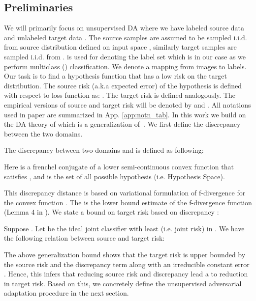 \documentclass[table,dvipsnames]{article}
\theoremstyle{plain}
\theoremstyle{definition}
\theoremstyle{remark}
\begin{document}
\subsection{Preliminaries} 
We will primarily focus on unsupervised DA where we have labeled source data  and unlabeled target data . The source samples are assumed to be sampled i.i.d. from source distribution  defined on input space , similarly target samples are sampled i.i.d. from .  is used for denoting the label set which is  in our case as we perform multiclass () classification. We denote  a mapping from images to labels. Our task is to find a hypothesis function  that {has a low risk on the target distribution}. The source risk (a.k.a expected error) of the hypothesis  is defined with respect to loss function  as: . The target risk  is defined analogously. The empirical versions of source and target risk will be denoted by  and . All notations used in paper are summarized in App. \ref{app:notn_tab}. In this work we build on the DA theory of \citep{acuna2021f} {which is a generalization of~\citet{ben2010theory}}. 
We first define the discrepancy between the two domains.



\begin{definition}[ discrepancy] The discrepancy between two domains  and  is defined as following:

Here  is a frenchel conjugate of a lower semi-continuous convex function   that satisfies , and  is the set of all possible hypothesis (i.e. Hypothesis Space).
\end{definition}

This discrepancy distance  is based on variational formulation of f-divergence \citep{nguyen2010estimating} for the convex function . The  is the lower bound estimate of the f-divergence function  (Lemma 4 in \citep{acuna2021f}). We state a bound on target risk  based on  discrepancy \citep{acuna2021f}:
\begin{theorem}
\label{th:gen-bound}
Suppose . Let  be the ideal joint classifier with {least}  {(i.e. joint risk)} in . We have the following relation between source and target risk:

\end{theorem}
The above generalization bound shows that the target risk  is upper bounded by the source risk  and the discrepancy term  along with an irreducible constant error . Hence, this infers that reducing source risk and discrepancy lead a to reduction in target risk. Based on this, we concretely define the unsupervised adversarial adaptation procedure in the next section.
\end{document}
